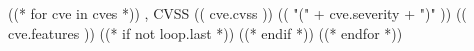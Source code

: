 
((* for cve in cves *))
  \cvachievement
    {}
    {, CVSS (( cve.cvss )) (( "(" + cve.severity + ")" ))}
    {(( cve.features ))}
  ((* if not loop.last *))
    \dividerbig
  ((* endif *))
((* endfor *))
